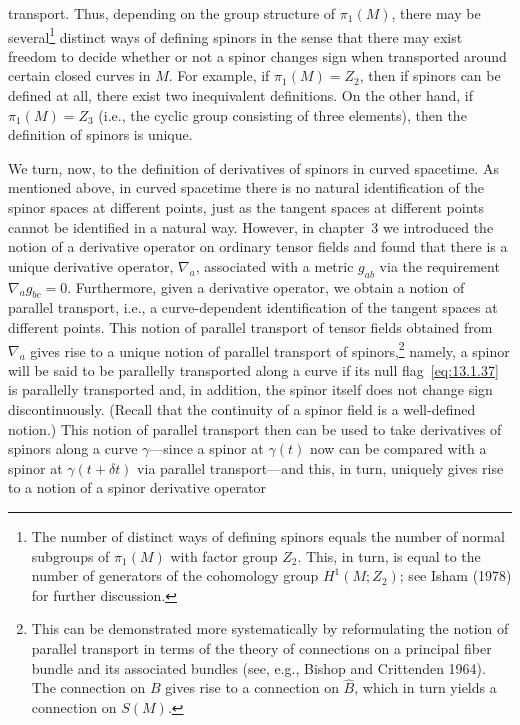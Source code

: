 transport. Thus, depending on the group structure of \(\pi_1(M)\), there may be
several\footnote{The number of distinct ways of defining spinors equals the number
of normal subgroups of \(\pi_1(M)\) with factor group \(Z_2\). This, in turn, is
equal to the number of generators of the cohomology group \(H^1(M;Z_2)\); see Isham
(1978) for further discussion.} distinct ways of defining spinors in the sense that
there may exist freedom to decide whether or not a spinor changes sign when
transported around certain closed curves in \(M\). For example, if \(\pi_1(M)=Z_2\),
then if spinors can be defined at all, there exist two inequivalent definitions. On
the other hand, if \(\pi_1(M)=Z_3\) (i.e., the cyclic group consisting of three
elements), then the definition of spinors is unique.

We turn, now, to the definition of derivatives of spinors in curved spacetime. As
mentioned above, in curved spacetime there is no natural identification of the
spinor spaces at different points, just as the tangent spaces at different points
cannot be identified in a natural way. However, in chapter~3 we introduced the
notion of a derivative operator on ordinary tensor fields and found that there is a
unique derivative operator, \(\nabla_a\), associated with a metric \(g_{ab}\) via
the requirement \(\nabla_a g_{bc}=0\). Furthermore, given a derivative operator, we
obtain a notion of parallel transport, i.e., a curve-dependent identification of the
tangent spaces at different points. This notion of parallel transport of tensor
fields obtained from \(\nabla_a\) gives rise to a unique notion of parallel transport
of spinors,\footnote{This can be demonstrated more systematically by reformulating
the notion of parallel transport in terms of the theory of connections on a principal
fiber bundle and its associated bundles (see, e.g., Bishop and Crittenden 1964). The
connection on \(B\) gives rise to a connection on \(\widehat B\), which in turn
yields a connection on \(S(M)\).} namely, a spinor will be said to be parallelly
transported along a curve if its null flag~\eqref{eq:13.1.37} is parallelly
transported and, in addition, the spinor itself does not change sign
discontinuously. (Recall that the continuity of a spinor field is a well-defined
notion.) This notion of parallel transport then can be used to take derivatives of
spinors along a curve \(\gamma\)---since a spinor at \(\gamma(t)\) now can be
compared with a spinor at \(\gamma(t+\delta t)\) via parallel transport---and this,
in turn, uniquely gives rise to a notion of a spinor derivative operator
